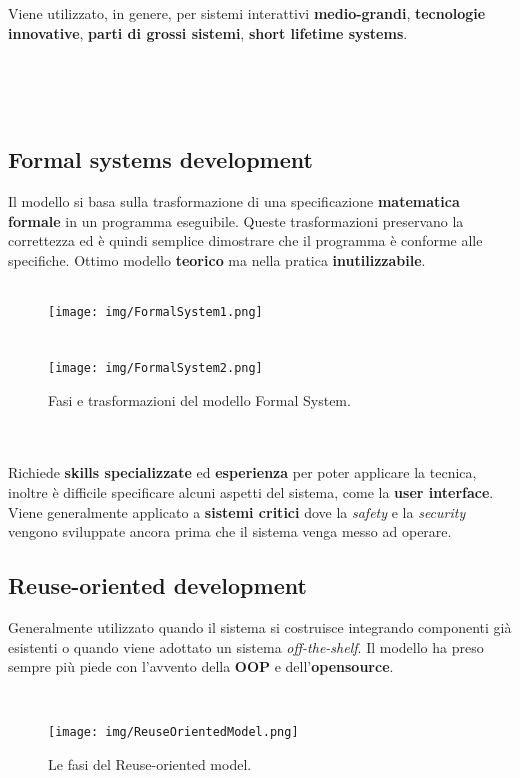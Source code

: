 Viene utilizzato, in genere, per sistemi interattivi \textbf{medio-grandi},
\textbf{tecnologie innovative}, \textbf{parti di grossi sistemi},
\textbf{short lifetime systems}.

\ \\~\\~\\

\subsection{Formal systems development}
Il modello si basa sulla trasformazione di una specificazione
\textbf{matematica formale} in un programma eseguibile. Queste
trasformazioni preservano la correttezza ed \`e quindi semplice
dimostrare che il programma \`e conforme alle specifiche.
Ottimo modello \textbf{teorico} ma nella pratica \textbf{inutilizzabile}.\\

\ \\
\begin{figure}[H]
    \centering
    \texttt{[image: img/FormalSystem1.png]}
    \\~\\~\\
    \texttt{[image: img/FormalSystem2.png]}
    \caption*{Fasi e trasformazioni del modello Formal System.}
\end{figure}

\ \\~\\
Richiede \textbf{skills specializzate} ed \textbf{esperienza} per
poter applicare la tecnica, inoltre \`e difficile specificare
alcuni aspetti del sistema, come la \textbf{user interface}.
Viene generalmente applicato a \textbf{sistemi critici} dove la
\textit{safety} e la \textit{security} vengono sviluppate ancora prima
che il sistema venga messo ad operare.

\newpage
\subsection{Reuse-oriented development}
Generalmente utilizzato quando il sistema si costruisce integrando
componenti gi\`a esistenti o quando viene adottato un sistema
\textit{off-the-shelf}. Il modello ha preso sempre pi\`u piede
con l'avvento della \textbf{OOP} e dell'\textbf{opensource}.

\ \\
\begin{figure}[H]
    \centering
    \texttt{[image: img/ReuseOrientedModel.png]}
    \caption*{Le fasi del Reuse-oriented model.}
\end{figure}

